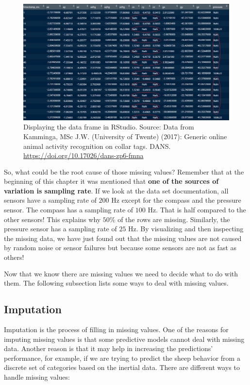 \documentclass[
  11pt,
]{krantz}
\begin{document}
\begin{figure}

{\centering \includegraphics[width=1\linewidth]{images/missingvalues} 

}

\caption{Displaying the data frame in RStudio. Source: Data from Kamminga, MSc J.W. (University of Twente) (2017): Generic online animal activity recognition on collar tags. DANS. \url{https://doi.org/10.17026/dans-zp6-fmna}}\label{fig:missvaluesdf}
\end{figure}

So, what could be the root cause of those missing values? Remember that at the beginning of this chapter it was mentioned that \textbf{one of the sources of variation is sampling rate}. If we look at the data set documentation, all sensors have a sampling rate of \(200\) Hz except for the compass and the pressure sensor. The compass has a sampling rate of \(100\) Hz. That is half compared to the other sensors! This explains why \(50\%\) of the rows are missing. Similarly, the pressure sensor has a sampling rate of \(25\) Hz. By visualizing and then inspecting the missing data, we have just found out that the missing values are not caused by random noise or sensor failures but because some sensors are not as fast as others!

Now that we know there are missing values we need to decide what to do with them. The following subsection lists some ways to deal with missing values.

\hypertarget{imputation}{%
\subsection{Imputation}\label{imputation}}

Imputation is the process of filling in missing values. One of the reasons for imputing missing values is that some predictive models cannot deal with missing data. Another reason is that it may help in increasing the predictions' performance, for example, if we are trying to predict the sheep behavior from a discrete set of categories based on the inertial data. There are different ways to handle missing values:
\end{document}
